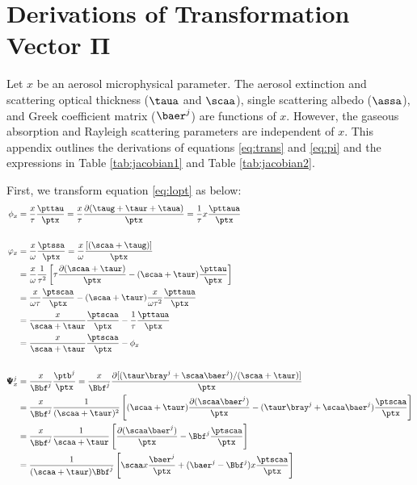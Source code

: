 \chapter{Derivations of Transformation Vector $\pmb{\Pi}$} \label{app:pi}

Let $x$ be an aerosol microphysical parameter. The aerosol extinction and
scattering optical thickness ($\taua$ and $\scaa$), single scattering albedo
($\assa$), and Greek coefficient matrix ($\baer^j$) are functions of $x$. 
However, the gaseous absorption and Rayleigh scattering parameters are 
independent of $x$. This appendix outlines the derivations of equations 
\eqref{eq:trans} and \eqref{eq:pi} and the expressions in
Table \ref{tab:jacobian1} and Table \ref{tab:jacobian2}. 

First, we transform equation \eqref{eq:lopt} as below:
\begingroup
\allowdisplaybreaks
\begin{align}
\phi_x &= \frac{x}{\tau}\frac{\pttau}{\ptx} 
        = \frac{x}{\tau}\frac{\partial(\taug+\taur+\taua)}{\ptx} 
        = \frac{1}{\tau}x\frac{\pttaua}{\ptx} \label{eq:phix1} \\
        \nonumber \\
\varphi_x 
        &= \frac{x}{\omega}\frac{\ptssa}{\ptx} 
         = \frac{x}{\omega}\frac{[(\scaa+\taug)]}{\ptx}
         \nonumber \\
        &= \frac{x}{\omega}\frac{1}{\tau^2}
           \left[ \tau\frac{\partial{(\scaa+\taur)}}{\ptx}
                - (\scaa+\taur)\frac{\pttau}{\ptx}\right]
         \nonumber \\
        &= \frac{x}{\omega\tau}\frac{\ptscaa}{\ptx}
           -(\scaa+\taur)\frac{x}{\omega\tau^2}\frac{\pttaua}{\ptx}
         \nonumber \\
        &= \frac{x}{\scaa+\taur}\frac{\ptscaa}{\ptx}
           -\frac{1}{\tau}\frac{\pttaua}{\ptx}
         \nonumber \\
        &= \frac{x}{\scaa+\taur}\frac{\ptscaa}{\ptx} - \phi_x \label{eq:phix2}\\
         \nonumber \\
\pmb{\Psi}_x^j 
        &= \frac{x}{\Bbf^j}\frac{\ptb^j}{\ptx} 
         = \frac{x}{\Bbf^j}\frac{\partial{[(\taur\bray^j+\scaa\baer^j)/(\scaa+\taur)]}}{\ptx}
         \nonumber \\
        &= \frac{x}{\Bbf^j}\frac{1}{(\scaa+\taur)^2}\left[
           (\scaa+\taur)\frac{\partial(\scaa\baer^j)}{\ptx}
           - (\taur\bray^j+\scaa\baer^j)\frac{\ptscaa}{\ptx}\right]
         \nonumber \\
        &= \frac{x}{\Bbf^j}\frac{1}{\scaa+\taur} \left[
           \frac{\partial(\scaa\baer^j)}{\ptx}-\Bbf^j\frac{\ptscaa}{\ptx}\right]
         \nonumber \\
        &= \frac{1}{(\scaa+\taur)\Bbf^j} \left[ 
           \scaa x\frac{\baer^j}{\ptx}+(\baer^j-\Bbf^j)x\frac{\ptscaa}{\ptx}
           \right] \label{eq:phix3}
\end{align}
\endgroup

